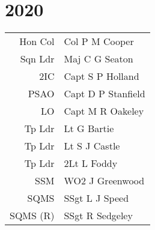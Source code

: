 \chapter*{2020}

\begin{center}
  \begin{tabular}{rl}
    Hon Col & Col P M Cooper \\
    Sqn Ldr & Maj C G Seaton \\
    2IC & Capt S P Holland \\
    PSAO & Capt D P Stanfield \\
    LO & Capt M R Oakeley \\
    Tp Ldr & Lt G Bartie \\
    Tp Ldr & Lt S J Castle \\
    Tp Ldr & 2Lt L Foddy \\
    SSM & WO2 J Greenwood \\
    SQMS & SSgt L J Speed \\
    SQMS (R) & SSgt R Sedgeley \\
  \end{tabular}
\end{center}

